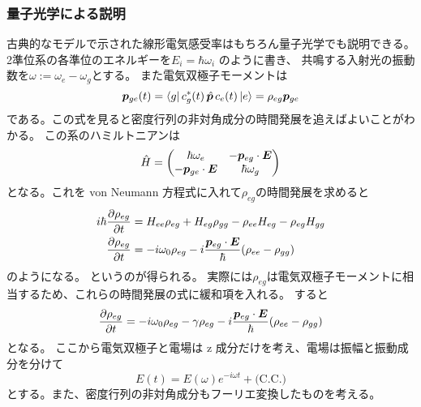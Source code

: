 \documentclass[11pt,dvipdfmx,a4paper]{jsarticle}
\newcommand{\cc}{\text{(C.C.)}}
\begin{document}
\subsubsection{量子光学による説明}
古典的なモデルで示された線形電気感受率はもちろん量子光学でも説明できる。
2準位系の各準位のエネルギーを\(E_i = \hbar \omega_i\) のように書き、
共鳴する入射光の振動数を\(\omega := \omega_e -\omega_g\)とする。
また電気双極子モーメントは
\begin{equation}
	\vb*{p}_{ge}(t) = \bra{g}c_g^*(t)\,\hat{\vb*{p}}\,c_e(t)\ket{e} = \rho_{eg}\vb*{p}_{ge}
\end{equation}
である。この式を見ると密度行列の非対角成分の時間発展を追えばよいことがわかる。
この系のハミルトニアンは
\begin{equation}
	\hat{H} =
	\begin{pmatrix}
		\hbar \omega_e  & -\vb*{p}_{eg}\cdot\vb*{E}\\
		-\vb*{p}_{ge}\cdot\vb*{E} & \hbar \omega_g
	\end{pmatrix}
\end{equation}
となる。これを von Neumann 方程式に入れて\(\rho_{eg}\)の時間発展を求めると
\begin{align}
	i\hbar \pdv{\rho_{eg}}{t} &= H_{ee}\rho_{eg} + H_{eg}\rho_{gg} - \rho_{ee} H_{eg} - \rho_{eg} H_{gg}\\
	\pdv{\rho_{eg}}{t} &= -i\omega_0\rho_{eg} -i\frac{\vb*{p}_{eg}\cdot \vb*{E}}{\hbar}(\rho_{ee}-\rho_{gg})
\end{align}
のようになる。
というのが得られる。
実際には\(\rho_{eg}\)は電気双極子モーメントに相当するため、これらの時間発展の式に緩和項を入れる。
すると
\begin{align}
	\pdv{\rho_{eg}}{t} &= -i\omega_0\rho_{eg} -\gamma\rho_{eg} -i\frac{\vb*{p}_{eg}\cdot \vb*{E}}{\hbar}(\rho_{ee}-\rho_{gg})\\
\end{align}
となる。
ここから電気双極子と電場は z 成分だけを考え、電場は振幅と振動成分を分けて
\begin{equation}
	E(t) = E(\omega)e^{-i\omega t} + \cc
\end{equation}
とする。また、密度行列の非対角成分もフーリエ変換したものを考える。
\end{document}
